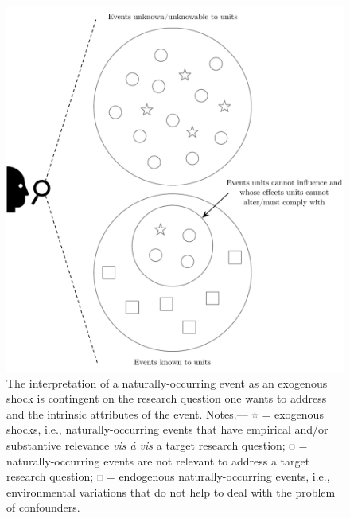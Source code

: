 \begin{refsection}
\begin{figure}[!htbp]
  \centering
  \includegraphics[width=1\textwidth]{exhibits/exogenous_shocks_and_ne.pdf}
  \caption{The interpretation of a naturally-occurring event as an exogenous 
  shock is contingent on the research question one wants to address and the 
  intrinsic attributes of the event. 
  Notes.---  
  \includegraphics[width=0.02\textwidth]{exhibits/exogenous_shocks_and_ne_0.pdf}
  = exogenous shocks, i.e., naturally-occurring events that have empirical and/or 
  substantive relevance \textit{vis \'{a} vis} a target research question;
  \includegraphics[width=0.0175\textwidth]{exhibits/exogenous_shocks_and_ne_2.pdf}
  = naturally-occurring events are not relevant to address a target research 
  question;
  \includegraphics[width=0.0175\textwidth]{exhibits/exogenous_shocks_and_ne_1.pdf}
  = endogenous naturally-occurring events, i.e., environmental variations that 
  do not help to deal with the problem of confounders.}
  \label{fig:exogeneous_shocks_and_ne}
\end{figure}


\end{refsection}
